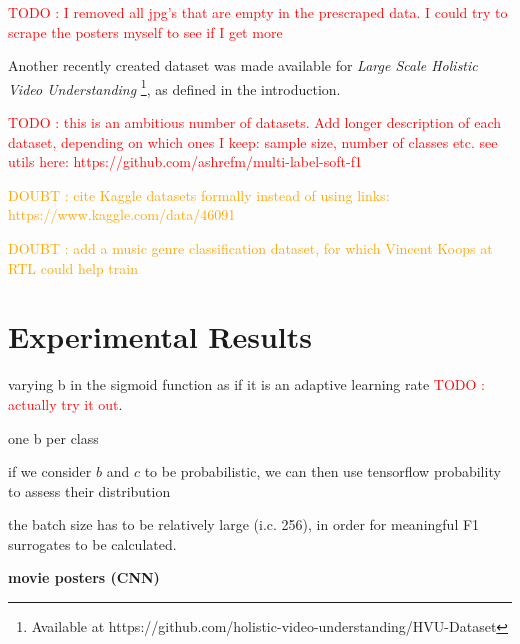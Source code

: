 \documentclass[sigconf,natbib,screen=true,review=true,anonymous]{acmart}
\newcommand\todo[1]{\textcolor{red}{TODO : #1}}
\newcommand\doubt[1]{\textcolor{orange}{DOUBT : #1}}
\begin{document}
\todo{I removed all jpg's that are empty in the prescraped data. I could try to scrape the posters myself to see if I get more}

Another recently created dataset was made available for \emph{Large Scale Holistic Video Understanding} \cite{holisticVideoData} \footnote{Available at https://github.com/holistic-video-understanding/HVU-Dataset}, as defined in the introduction.





\todo{this is an ambitious number of datasets. Add longer description of each dataset, depending on which ones I keep: sample size, number of classes etc. see utils here: https://github.com/ashrefm/multi-label-soft-f1}

\doubt{cite Kaggle datasets formally instead of using links: https://www.kaggle.com/data/46091}

\doubt{add a music genre classification dataset, for which Vincent Koops at RTL could help train}

\newpage

\section{Experimental Results}
\label{sec:orgcb76c9d}

varying b in the sigmoid function as if it is an adaptive learning rate \todo{actually try it out}.

one b per class

if we consider \(b\) and \(c\) to be probabilistic, we can then use tensorflow probability to assess their distribution

the batch size has to be relatively large (i.c. 256), in order for meaningful F1 surrogates to be calculated.



\textbf{movie posters (CNN)}
\end{document}
